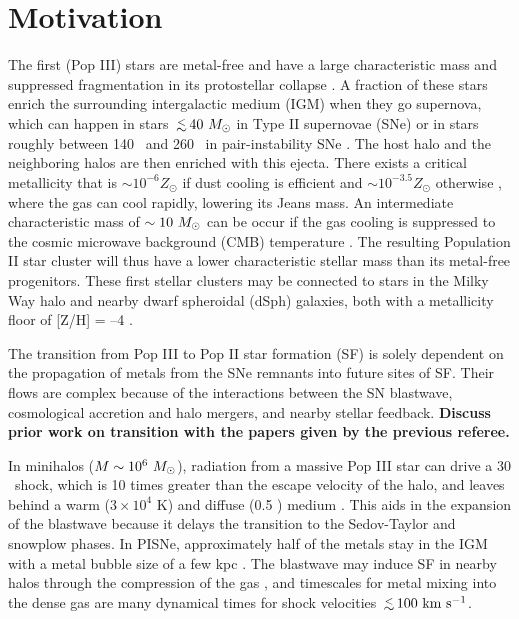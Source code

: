 \documentclass[12pt,preprint]{aastex}
\begin{document}

\section{Motivation}

The first (Pop III) stars are metal-free and have a large
characteristic mass and suppressed fragmentation in its protostellar
collapse \citep{ABN02, Bromm02_P3, OShea07a}.  A fraction of these
stars enrich the surrounding intergalactic medium (IGM) when they go
supernova, which can happen in stars $\lsim 40~\Ms$ in Type II
supernovae (SNe) or in stars roughly between 140 \Ms~and 260 \Ms~in
pair-instability SNe \citep[PISNe;][]{2002ApJ...567..532H}.  The host
halo and the neighboring halos are then enriched with this ejecta.
There exists a critical metallicity that is $\sim 10^{-6} Z_\odot$ if
dust cooling is efficient \citep{Omukai05, Schneider06_Frag, clark08}
and $\sim 10^{-3.5} Z_\odot$ otherwise \citep{Bromm01,
  2009ApJ...691..441S}, where the gas can cool rapidly, lowering its
Jeans mass.  An intermediate characteristic mass of $\sim10~\Ms$ can
be occur if the gas cooling is suppressed to the cosmic microwave
background (CMB) temperature \citep{Larson98, Tumlinson07_IMF,
  2009ApJ...691..441S}.  The resulting Population II star cluster will
thus have a lower characteristic stellar mass than its metal-free
progenitors.  These first stellar clusters may be connected to stars
in the Milky Way halo and nearby dwarf spheroidal (dSph) galaxies,
both with a metallicity floor of [Z/H] = --4 \citep{Beers05,
  Tafelmeyer10, Frebel10_Obs}.

The transition from Pop III to Pop II star formation (SF) is solely
dependent on the propagation of metals from the SNe remnants into
future sites of SF.  Their flows are complex because of the
interactions between the SN blastwave, cosmological accretion and halo
mergers, and nearby stellar feedback.  \textbf{Discuss prior work on
  transition with the papers given by the previous referee.}

In minihalos ($M \sim 10^6~\Ms$), radiation from a massive Pop III
star can drive a 30 \kms~shock, which is 10 times greater than the
escape velocity of the halo, and leaves behind a warm ($3 \times 10^4$
K) and diffuse (0.5 \cubecm) medium \citep{Kitayama04, Whalen04,
  Abel07}.  This aids in the expansion of the blastwave because it
delays the transition to the Sedov-Taylor and snowplow phases.  In
PISNe, approximately half of the metals stay in the IGM with a metal
bubble size of a few kpc \citep{Wise08_Gal, Greif10}.  The blastwave
may induce SF in nearby halos through the compression of the gas
\citep{Ferrara98}, and timescales for metal mixing into the dense gas
are many dynamical times \citep{Cen08} for shock velocities
$\lsim100~\kms$.
\end{document}
